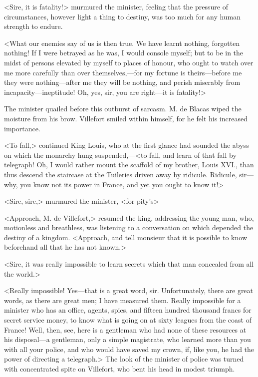  <Sire, it is fatality!> murmured the minister, feeling that the pressure of circumstances, however light a thing to destiny, was too much for any human strength to endure. 

 <What our enemies say of us is then true. We have learnt nothing, forgotten nothing! If I were betrayed as he was, I would console myself; but to be in the midst of persons elevated by myself to places of honour, who ought to watch over me more carefully than over themselves,—for my fortune is theirs—before me they were nothing—after me they will be nothing, and perish miserably from incapacity—ineptitude! Oh, yes, sir, you are right—it is fatality!> 

 The minister quailed before this outburst of sarcasm. M. de Blacas wiped the moisture from his brow. Villefort smiled within himself, for he felt his increased importance. 

 <To fall,> continued King Louis, who at the first glance had sounded the abyss on which the monarchy hung suspended,—<to fall, and learn of that fall by telegraph! Oh, I would rather mount the scaffold of my brother, Louis XVI., than thus descend the staircase at the Tuileries driven away by ridicule. Ridicule, sir—why, you know not its power in France, and yet you ought to know it!> 

 <Sire, sire,> murmured the minister, <for pity's\longdash> 

 <Approach, M. de Villefort,> resumed the king, addressing the young man, who, motionless and breathless, was listening to a conversation on which depended the destiny of a kingdom. <Approach, and tell monsieur that it is possible to know beforehand all that he has not known.> 

 <Sire, it was really impossible to learn secrets which that man concealed from all the world.> 

 <Really impossible! Yes—that is a great word, sir. Unfortunately, there are great words, as there are great men; I have measured them. Really impossible for a minister who has an office, agents, spies, and fifteen hundred thousand francs for secret service money, to know what is going on at sixty leagues from the coast of France! Well, then, see, here is a gentleman who had none of these resources at his disposal—a gentleman, only a simple magistrate, who learned more than you with all your police, and who would have saved my crown, if, like you, he had the power of directing a telegraph.> The look of the minister of police was turned with concentrated spite on Villefort, who bent his head in modest triumph. 

